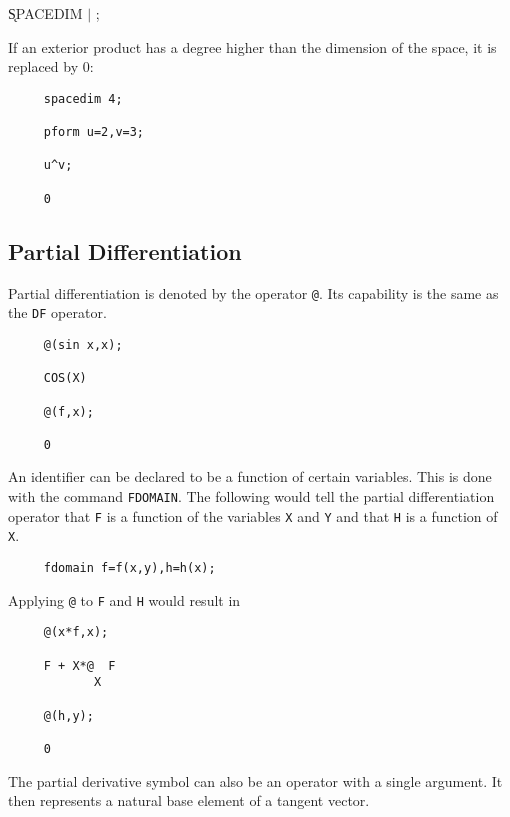 \hspace*{2em} \k{SPACEDIM}  $\mid$ ;

If an exterior product has a degree higher than the dimension of the
space, it is replaced by 0:

\begin{verbatim}
     spacedim 4;

     pform u=2,v=3;

     u^v;

     0
\end{verbatim}


\subsection{Partial Differentiation}

Partial differentiation is denoted by the operator {\tt @}\label{at}.  Its
capability is the same as the {\REDUCE} {\tt DF} operator.
 

\example{}

\begin{verbatim}
     @(sin x,x);

     COS(X)

     @(f,x);

     0
\end{verbatim}

An identifier can be declared to be a function of certain variables.
This is done with the command {\tt FDOMAIN}\label{FDOMAIN}.  The
following would tell the partial differentiation operator that {\tt F}
is a function of the variables {\tt X} and {\tt Y} and that {\tt H} is
a function of {\tt X}.
\begin{verbatim}
     fdomain f=f(x,y),h=h(x);
\end{verbatim}
Applying {\tt @} to {\tt F} and {\tt H} would result in
\begin{verbatim}
     @(x*f,x);

     F + X*@  F
            X

     @(h,y);

     0
\end{verbatim}

The partial derivative symbol can also be an operator with a single
argument.  It then represents a natural base element of a tangent
vector\label{at1}.

